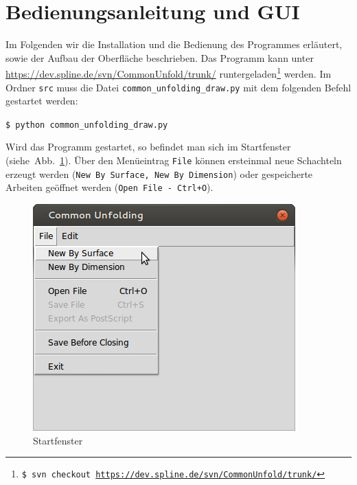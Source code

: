 \section{Bedienungsanleitung und GUI}
\label{sec:frontend}

Im Folgenden wir die Installation und die Bedienung des Programmes erläutert, sowie der Aufbau der Oberfläche beschrieben. Das Programm kann unter \url{https://dev.spline.de/svn/CommonUnfold/trunk/} runtergeladen\footnote{\texttt{\$ svn checkout \url{https://dev.spline.de/svn/CommonUnfold/trunk/}}} werden. Im Ordner \texttt{src} muss die Datei \texttt{common\_unfolding\_draw.py} mit dem folgenden Befehl gestartet werden:\\

\centerline{\texttt{\$ python common\_unfolding\_draw.py\\}}


Wird das Programm gestartet, so befindet man sich im Startfenster (siehe~Abb.~\ref{fig:startFenster}). Über den Menüeintrag \texttt{File} können ersteinmal neue Schachteln erzeugt werden (\texttt{New By Surface, New By Dimension}) oder gespeicherte Arbeiten geöffnet werden (\texttt{Open File - Ctrl+O}).

\begin{figure}[htbp]
  \centering
  \includegraphics[scale=0.5]{03_pics/start.jpg}
  \caption{Startfenster}
  \label{fig:startFenster}
\end{figure}


